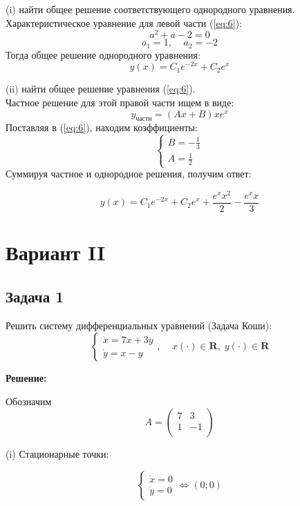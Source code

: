 \documentclass[a4paper, 12pt]{article}
\begin{document}
(i) найти общее решение соответствующего однородного уравнения.\\
Характеристическое уравнение для левой части (\ref{eq:6}):
\[a^2+a-2=0\]
\[a_{1}=1,\;\;\;\; a_2 = -2\]
Тогда общее решение однородного уравнения:
\begin{equation}
y(x) = C_1e^{-2x}+C_2e^x
\label{eq:7}
\end{equation}

(ii) найти общее решение уравнения (\ref{eq:6}).\\
Частное решение для этой правой части ищем в виде:
\[ y_{\text{частн}} = (Ax+B)xe^x\]
Поставляя в (\ref{eq:6}), находим коэффициенты: 
\[
\left\{
\begin{array}{lr}
B = -\frac 1 3 \\
A = \frac 1 2
\end{array}
\right.
\]
Суммируя частное и однородное решения, получим ответ:

\[y(x) = C_1e^{-2x}+C_2e^x+\frac{e^xx^2}{2}-\frac{e^xx}{3} \]


	\section*{Вариант II}
		\subsection* {Задача 1}


 Решить систему дифференциальных уравнений (Задача Коши): 
\begin{equation}
\left\{
\begin{array}{lr}
\dot{x} = 7x+3y\\
\dot{y} = x-y
\end{array}
\right.
, \;\;\;\; x(\cdot)\in \textbf{R},\; y(\cdot)\in \textbf{R}
\label{eq:1}
\end{equation}

\textbf{Решение:} \par
Обозначим 
\[
A = \left(
\begin{array}{cc}
7 & 3\\
1 & -1\\
\end{array}
\right)\]

(i) Стационарные точки:

\[
\left\{
\begin{array}{lr}
\dot{x} = 0\\
\dot{y} = 0
\end{array}
\right.
\Leftrightarrow (0;0)
\]
\end{document}

